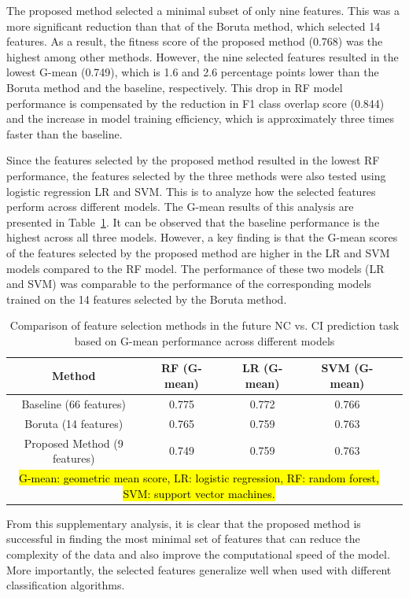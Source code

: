 The proposed method selected a minimal subset of only nine features. This was a more significant reduction than that of the Boruta method, which selected 14 features. As a result, the fitness score of the proposed method (0.768) was the highest among other methods. However, the nine selected features resulted in the lowest G-mean (0.749), which is 1.6 and 2.6 percentage points lower than the Boruta method and the baseline, respectively. This drop in RF model performance is compensated by the reduction in F1 class overlap score (0.844) and the increase in model training efficiency, which is approximately three times faster than the baseline.

Since the features selected by the proposed method resulted in the lowest RF performance, the features selected by the three methods were also tested using logistic regression LR and SVM. This is to analyze how the selected features perform across different models. The G-mean results of this analysis are presented in Table~\ref{table:fs-task3-more-models}. It can be observed that the baseline performance is the highest across all three models. However, a key finding is that the G-mean scores of the features selected by the proposed method are higher in the LR and SVM models compared to the RF model. The performance of these two models (LR and SVM) was comparable to the performance of the corresponding models trained on the 14 features selected by the Boruta method.

\begin{table}[!ht]
    \centering
    \caption{Comparison of feature selection methods in the future NC vs. CI prediction task based on G-mean performance across different models}
    \begin{tabular}{|c|c|c|c|c|}
    \hline
        Method & RF (G-mean) & LR (G-mean) & SVM (G-mean) \\ \hline
        Baseline (66 features) & 0.775 & 0.772 & 0.766 \\ \hline
        Boruta (14 features) & 0.765 & 0.759 & 0.763 \\ \hline
        Proposed Method (9 features) & 0.749 & 0.759 & 0.763 \\ \hline
        \multicolumn{4}{p{400pt}}{\footnotesize \hl{G-mean: geometric mean score, LR: logistic regression, RF: random forest, SVM: support vector machines.}}
    \end{tabular}
    \label{table:fs-task3-more-models}
\end{table}

From this supplementary analysis, it is clear that the proposed method is successful in finding the most minimal set of features that can reduce the complexity of the data and also improve the computational speed of the model. More importantly, the selected features generalize well when used with different classification algorithms.

